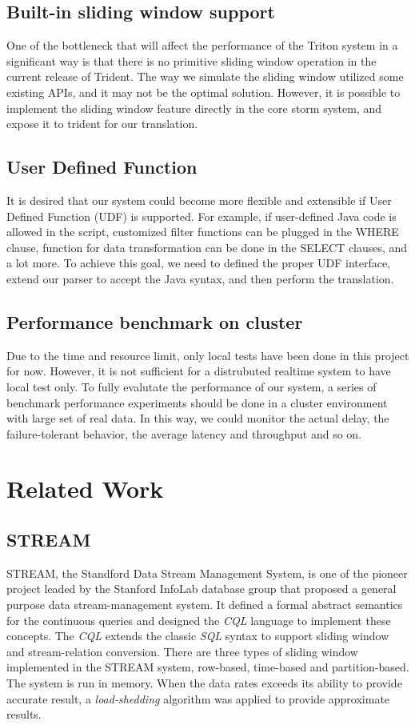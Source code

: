 \documentclass[conference, twocolumn, twoside, 11pt]{IEEEtran}
\theoremstyle{definition}
\begin{document}
\subsection{Built-in sliding window support}
One of the bottleneck that will affect the performance of the Triton system in a significant way is that there is no primitive sliding window operation in the current release of Trident.
The way we simulate the sliding window utilized some existing APIs, and it may not be the optimal solution. However, it is possible to implement the sliding window feature directly in
the core storm system, and expose it to trident for our translation.

\subsection{User Defined Function}
It is desired that our system could become more flexible and extensible if User Defined Function (UDF) is supported. For example, if user-defined Java code is allowed in the script,
customized filter functions can be plugged in the WHERE clause, function for data transformation can be done in the SELECT clauses, and a lot more.
To achieve this goal, we need to defined the proper UDF interface, extend our parser to accept the Java syntax, and then perform the translation.

\subsection{Performance benchmark on cluster}
Due to the time and resource limit, only local tests have been done in this project for now. However, it is not sufficient for a distrubuted realtime system to have local test only.
To fully evalutate the performance of our system, a series of benchmark performance experiments should be done in a cluster environment with large set of real data. In this way,
we could monitor the actual delay, the failure-tolerant behavior, the average latency and throughput and so on.


\section{Related Work}\label{rel-work}
\subsection{STREAM}
STREAM, the Standford Data Stream Management System, is one of the pioneer project leaded by the Stanford InfoLab database group that proposed a general purpose data stream-management system.
It defined a formal abstract semantics for the continuous queries and designed the \emph{CQL} language to implement these concepts. The \emph{CQL} extends the classic \emph{SQL} syntax to
support sliding window and stream-relation conversion. There are three types of sliding window implemented in the STREAM system, row-based, time-based and partition-based. The system is run in
memory. When the data rates exceeds its ability to provide accurate result, a \emph{load-shedding} algorithm was applied to provide approximate results.
\end{document}
